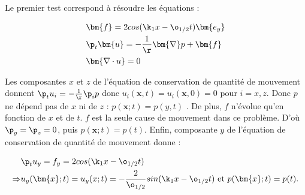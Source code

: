 Le premier test correspond à résoudre les équations : 

\begin{align*}
&\bm{f} = 2 cos(\k_1 x - \o_{1/2} t) \bm{e_y} \\
&\p_t \bm{u} = - \frac{1}{\r} \bm{\nabla} p + \bm{f} \\                
&\bm{ \nabla \cdot u } = 0 \\
\end{align*}

Les composantes $x$ et $z$ de l'équation de conservation de quantité de mouvement donnent $\p_t u_i = - \frac{1}{\r} \p_i p$ donc $u_i(\bm{x},t) = u_i(\bm{x},0) = 0$ pour $i={x,z}$. Donc $p$ ne dépend pas de $x$ ni de $z$ : $ p(\bm{x};t) = p(y,t)$ . De plus, $f$ n'évolue qu'en fonction de $x$ et de $t$. $f$ est la seule cause de mouvement dans ce problème. D'où $\p_y = \p_z = 0$, puis $ p(\bm{x};t) = p(t)$. Enfin, composante $y$ de l'équation de conservation de quantité de mouvement donne : 

\begin{align*}
&\p_t u_y = f_y = 2 cos(\k_1 x - \o_{1/2} t)\\  
\Rightarrow &u_y(\bm{x};t) = u_y(x;t) = - \frac{2}{\o_{1/2}} sin(\k_1 x - \o_{1/2} t)  \text{ et } p(\bm{x};t)=p(t).   
\end{align*}